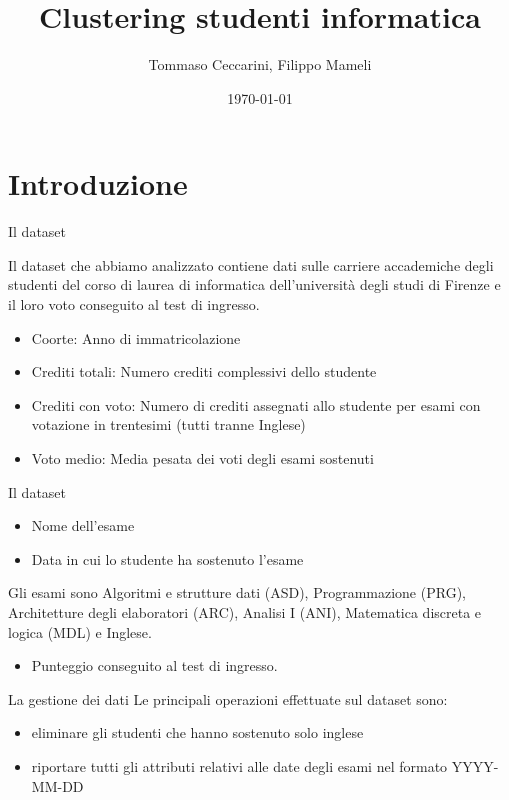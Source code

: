 \documentclass{beamer}
\title{Clustering studenti informatica}
\date{\today}
\author{Tommaso Ceccarini, Filippo Mameli}
\begin{document}
        
    \maketitle

    \section{Introduzione}
    
    \begin{frame}{Il dataset}

        Il dataset che abbiamo analizzato contiene dati sulle carriere accademiche degli studenti del corso di laurea di informatica dell'università degli studi di Firenze e il loro voto conseguito 
        al test di ingresso.
        \begin{itemize}
            \item Coorte: Anno di immatricolazione
            \item Crediti totali: Numero crediti complessivi dello studente
            \item Crediti con voto: Numero di crediti assegnati allo studente per esami con votazione in trentesimi (tutti tranne Inglese)
            \item Voto medio: Media pesata dei voti degli esami sostenuti
        \end{itemize}
    \end{frame}

    \begin{frame}{Il dataset}
        \begin{itemize}
            \item Nome dell'esame
            \item Data in cui lo studente ha sostenuto l'esame
        \end{itemize}
        Gli esami sono Algoritmi e strutture dati (ASD), Programmazione (PRG), Architetture degli elaboratori (ARC), Analisi I (ANI), Matematica discreta e logica (MDL) e Inglese.
        \begin{itemize}
            \item Punteggio conseguito al test di ingresso.
        \end{itemize}
    \end{frame}

    \begin{frame}{La gestione dei dati}
        Le principali operazioni effettuate sul dataset sono:
        \begin{itemize}
            \item eliminare gli studenti che hanno sostenuto solo inglese
            \item riportare tutti gli attributi relativi alle date degli esami nel formato YYYY-MM-DD
        \end{itemize}
    \end{frame}
\end{document}
